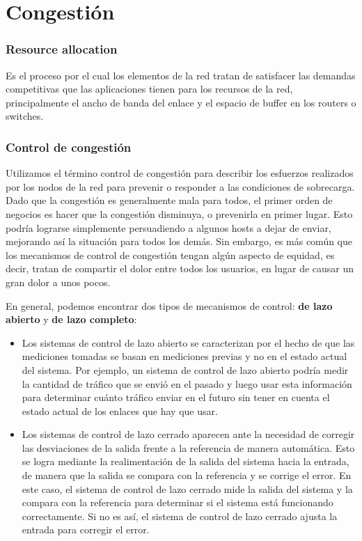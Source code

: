 \section{Congestión}
\subsubsection*{Resource allocation} Es el proceso por el cual los elementos de la red tratan de satisfacer las demandas competitivas que las aplicaciones tienen para los recursos de la red, principalmente el ancho de banda del enlace y el espacio de buffer en los routers o switches.

\subsubsection*{Control de congestión} 
Utilizamos el término control de congestión para describir los esfuerzos realizados por los nodos de la red para prevenir o responder a las condiciones de sobrecarga. Dado que la congestión es generalmente mala para todos, el primer orden de negocios es hacer que la congestión disminuya, o prevenirla en primer lugar. Esto podría lograrse simplemente persuadiendo a algunos hosts a dejar de enviar, mejorando así la situación para todos los demás. Sin embargo, es más común que los mecanismos de control de congestión tengan algún aspecto de equidad, es decir, tratan de compartir el dolor entre todos los usuarios, en lugar de causar un gran dolor a unos pocos. 

En general, podemos encontrar dos tipos de mecanismos de control: \textbf{de lazo abierto} y \textbf{de lazo completo}:

\begin{itemize}
  \item Los sistemas de control de lazo abierto
se caracterizan por el hecho de que las mediciones tomadas se basan en mediciones previas y no en el estado actual del sistema. Por ejemplo, un sistema de control de lazo abierto podría medir la cantidad de tráfico que se envió en el pasado y luego usar esta información para determinar cuánto tráfico enviar en el futuro sin tener en cuenta el estado actual de los enlaces que hay que usar.
 
\item Los sistemas de control de lazo cerrado aparecen ante la necesidad de corregir las desviaciones de la salida frente a la referencia de manera automática. Esto se logra mediante la realimentación de la salida del sistema hacia la entrada, de manera que la salida se compara con la referencia y se corrige el error. En este caso, el sistema de control de lazo cerrado mide la salida del sistema y la compara con la referencia para determinar si el sistema está funcionando correctamente. Si no es así, el sistema de control de lazo cerrado ajusta la entrada para corregir el error.
\end{itemize}
